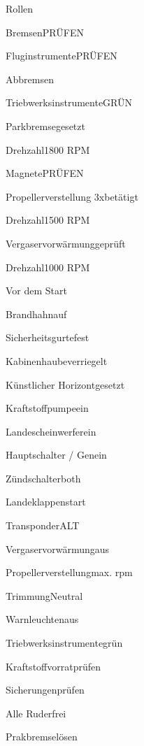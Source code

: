 \begin{task}
  \begin{checklist}{Rollen}
    \item{Bremsen}{PRÜFEN}
    \item{Fluginstrumente}{PRÜFEN}
  \end{checklist}
\end{task}

\begin{task}
  \begin{checklist}{Abbremsen}
    \item{Triebwerksinstrumente}{GRÜN}
    \item{Parkbremse}{gesetzt}
    \item{Drehzahl}{1800 RPM}
    \item{Magnete}{PRÜFEN}
    \item{Propellerverstellung 3x}{betätigt}
    \item{Drehzahl}{1500 RPM}
    \item{Vergaservorwärmung}{geprüft}
    \item{Drehzahl}{1000 RPM}
  \end{checklist}
\end{task}

\begin{task}
  \begin{checklist}{Vor dem Start}
    \item{Brandhahn}{auf}
    \item{Sicherheitsgurte}{fest}
    \item{Kabinenhaube}{verriegelt}
    \item{Künstlicher Horizont}{gesetzt}
    \item{Kraftstoffpumpe}{ein}
    \item{Landescheinwerfer}{ein}
    \item{Hauptschalter / Gen}{ein}
    \item{Zündschalter}{both}
    \item{Landeklappen}{start}
    \item{Transponder}{ALT}
    \item{Vergaservorwärmung}{aus}
    \item{Propellerverstellung}{max. rpm}
    \item{Trimmung}{Neutral}
    \item{Warnleuchten}{aus}
    \item{Triebwerksinstrumente}{grün}
    \item{Kraftstoffvorrat}{prüfen}
    \item{Sicherungen}{prüfen}
    \item{Alle Ruder}{frei}
    \item{Prakbremse}{lösen}
  \end{checklist}
\end{task}

